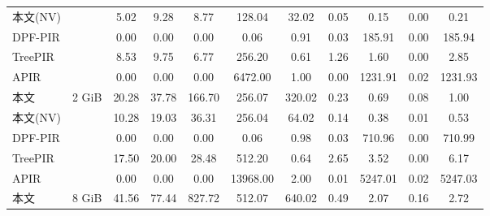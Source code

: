 \begin{table}[]
{\begin{tabular}{@{}lc|ccc|cccccc@{}}
        本文(NV) &                           & 5.02                         & 9.28                       & 8.77    & 128.04                        & \multicolumn{1}{c|}{32.02}   & 0.05  & 0.15     & 0.00        & 0.21     \\
        DPF-PIR       &                           & 0.00                         & 0.00                       & 0.00    & 0.06                          & \multicolumn{1}{c|}{0.91}    & 0.03  & 185.91   & 0.00        & 185.94   \\
        TreePIR   &                           & 8.53                         & 9.75                       & 6.77    & 256.20                        & \multicolumn{1}{c|}{0.61}    & 1.26  & 1.60     & 0.00        & 2.85     \\
        APIR      &                           & 0.00                         & 0.00                       & 0.00    & 6472.00                       & \multicolumn{1}{c|}{1.00}    & 0.00  & 1231.91  & 0.02        & 1231.93  \\ \midrule
        本文     & \multirow{5}{*}{2 GiB}   & 20.28                        & 37.78                      & 166.70  & 256.07                        & \multicolumn{1}{c|}{320.02}  & 0.23  & 0.69     & 0.08        & 1.00     \\
        本文(NV) &                           & 10.28                        & 19.03                      & 36.31   & 256.04                        & \multicolumn{1}{c|}{64.02}   & 0.14  & 0.38     & 0.01        & 0.53     \\
        DPF-PIR       &                           & 0.00                         & 0.00                       & 0.00    & 0.06                          & \multicolumn{1}{c|}{0.98}    & 0.03  & 710.96   & 0.00        & 710.99   \\
        TreePIR   &                           & 17.50                        & 20.00                      & 28.48   & 512.20                        & \multicolumn{1}{c|}{0.64}    & 2.65  & 3.52     & 0.00        & 6.17     \\
        APIR      &                           & 0.00                         & 0.00                       & 0.00    & 13968.00                      & \multicolumn{1}{c|}{2.00}    & 0.01  & 5247.01  & 0.02        & 5247.03  \\ \midrule
        本文     & \multirow{5}{*}{8 GiB}   & 41.56                        & 77.44                      & 827.72  & 512.07                        & \multicolumn{1}{c|}{640.02}  & 0.49  & 2.07     & 0.16        & 2.72     \\

\end{tabular}}
\end{table}
